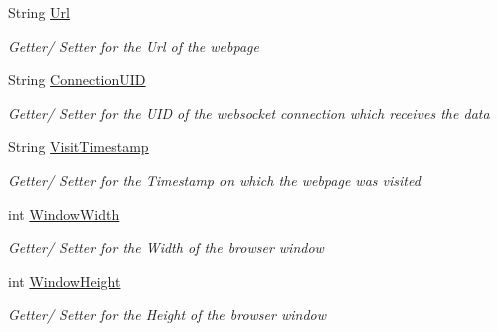 \begin{DoxyCompactItemize}
\item 
String \hyperlink{class_web_analyzer_1_1_models_1_1_data_model_1_1_webpage_model_a956b067ed12f422f646b7e2a4b6bb42d}{Url}
\begin{DoxyCompactList}\small\item\em Getter/ Setter for the Url of the webpage \end{DoxyCompactList}\item 
String \hyperlink{class_web_analyzer_1_1_models_1_1_data_model_1_1_webpage_model_a5f1bed3947c7e7b6a5fe34fdd23f3841}{Connection\+U\+I\+D}
\begin{DoxyCompactList}\small\item\em Getter/ Setter for the U\+I\+D of the websocket connection which receives the data \end{DoxyCompactList}\item 
String \hyperlink{class_web_analyzer_1_1_models_1_1_data_model_1_1_webpage_model_ac3378fdc78273706547ec3a9d377ef9a}{Visit\+Timestamp}
\begin{DoxyCompactList}\small\item\em Getter/ Setter for the Timestamp on which the webpage was visited \end{DoxyCompactList}\item 
int \hyperlink{class_web_analyzer_1_1_models_1_1_data_model_1_1_webpage_model_a3e3926562c05a94a3111f3a07cd8e131}{Window\+Width}
\begin{DoxyCompactList}\small\item\em Getter/ Setter for the Width of the browser window \end{DoxyCompactList}\item 
int \hyperlink{class_web_analyzer_1_1_models_1_1_data_model_1_1_webpage_model_a76b6e0896f14f8d7c0d7bf94b94ec058}{Window\+Height}
\begin{DoxyCompactList}\small\item\em Getter/ Setter for the Height of the browser window \end{DoxyCompactList}\item 

\end{DoxyCompactItemize}
